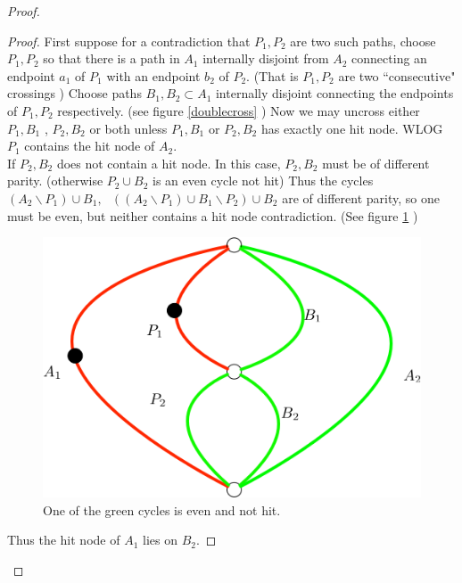 \documentclass[letterpaper,11pt]{article}
\newcommand{\0}{\mathbb{0}}
\newcommand{\1}{\mathbb{1}}
\begin{document}
\begin{proof}
\begin{proof}
First suppose for a contradiction that $P_1 , P_2$ are two such paths, choose $P_1 , P_2 $  so that  there is  a path in $A_1$  internally disjoint from $A_2$   connecting an endpoint $a_1 $ of $P_1 $  with an endpoint  $b_2 $ of $ P_2 $. (That is $P_1, P_2$ are two ``consecutive" crossings ) Choose paths $B_1, B_2  \subset A_1$    internally disjoint connecting the endpoints of $P_1, P_2$ respectively. (see figure \ref{doublecross} )  %
Now we may uncross either $P_1, B_1$ , $P_2, B_2$  or both  unless $P_1,B_1$  or $P_2, B_2$ has exactly one hit node. WLOG $P_1$ contains the hit node of $A_2$.  \\
 If  $P_2, B_2$ does not contain a hit node.  In this case, $P_2 , B_2$ must be of different parity. (otherwise $P_2 \cup B_2$ is an even cycle not hit) Thus the cycles $ (A_2 \backslash P_1) \cup  B_1 , \ \ \ (  (A_2 \backslash P_1 ) \cup  B_1 \backslash P_2 ) \cup B_2 $ are of different parity, so one must be even, but neither contains a hit node contradiction.  (See figure \ref{doublecrosscontradiction} )
 \begin{figure}[h]
           \includegraphics[scale=0.3]{DoubleCrossContradiction}  
           \caption{One of the green cycles is even and not hit.}
     \label{doublecrosscontradiction}
  \end{figure}
Thus the hit node of $A_1$ lies on $B_2$.

\end{proof}
\end{proof}
\end{document}
